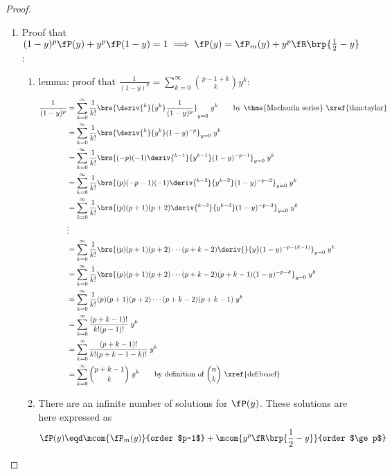 \begin{proof}
  \begin{enumerate}
    \item Proof that 
      $(1-y)^p \fP(y) + y^p \fP(1-y) = 1 \implies \fP(y)=\fP_m(y) + y^p \fR\brp{\frac{1}{2}-y}$:
      \begin{enumerate}
        \item lemma: proof that 
          $\frac{1}{(1-y)^p}=\sum_{k=0}^{\infty} {p-1+k \choose k} y^k$:
          \label{item:gcd_yp_1yp}
          \begin{align*}
            \frac{1}{(1-y)^p}
              &= \sum_{k=0}^{\infty} \frac{1}{k!}
                 \brs{\deriv{^k}{y^k}\frac{1}{(1-y)^p}}_{y=0} \; y^k
               \qquad\text{by \thme{Maclaurin series} \xref{thm:taylor}}
            \\&= \sum_{k=0}^{\infty} \frac{1}{k!}
                 \brs{\deriv{^k}{y^k}(1-y)^{-p}}_{y=0} \; y^k
            \\&= \sum_{k=0}^{\infty} \frac{1}{k!}
                 \brs{(-p)(-1)\deriv{^{k-1}}{y^{k-1}}(1-y)^{-p-1}}_{y=0} \; y^k
            \\&= \sum_{k=0}^{\infty} \frac{1}{k!}
                 \brs{(p)(-p-1)(-1)\deriv{^{k-2}}{y^{k-2}}(1-y)^{-p-2}}_{y=0} \; y^k
            \\&= \sum_{k=0}^{\infty} \frac{1}{k!}
                 \brs{(p)(p+1)(p+2)\deriv{^{k-3}}{y^{k-3}}(1-y)^{-p-3}}_{y=0} \; y^k
            \\&\vdots
            \\&= \sum_{k=0}^{\infty} \frac{1}{k!}
                 \brs{(p)(p+1)(p+2)\cdots(p+k-2)\deriv{}{y}(1-y)^{-p-(k-1)}}_{y=0} \; y^k
            \\&= \sum_{k=0}^{\infty} \frac{1}{k!}
                 \brs{(p)(p+1)(p+2)\cdots(p+k-2)(p+k-1)(1-y)^{-p-k}}_{y=0} \; y^k
            \\&= \sum_{k=0}^{\infty} \frac{1}{k!}
                 (p)(p+1)(p+2)\cdots(p+k-2)(p+k-1) \; y^k
            \\&= \sum_{k=0}^{\infty} \frac{(p+k-1)!}{k!(p-1)!} \; y^k
            \\&= \sum_{k=0}^{\infty} \frac{(p+k-1)!}{k!(p+k-1-k)!} \; y^k
            \\&= \sum_{k=0}^{\infty} {p+k-1 \choose k} \; y^k
                 \qquad\text{by definition of ${n \choose k}$ \xref{def:bcoef}}
          \end{align*}

        \item There are an infinite number of solutions for $\fP(y)$. 
              These solutions are here expressed as
              \[ \fP(y) 
                   \eqd \mcom{\fP_m(y)}{order $p-1$} 
                   +    \mcom{y^p \fR\brp{\frac{1}{2}-y}}{order $\ge p$}
              \]
           

\end{enumerate}
\end{enumerate}
\end{proof}
